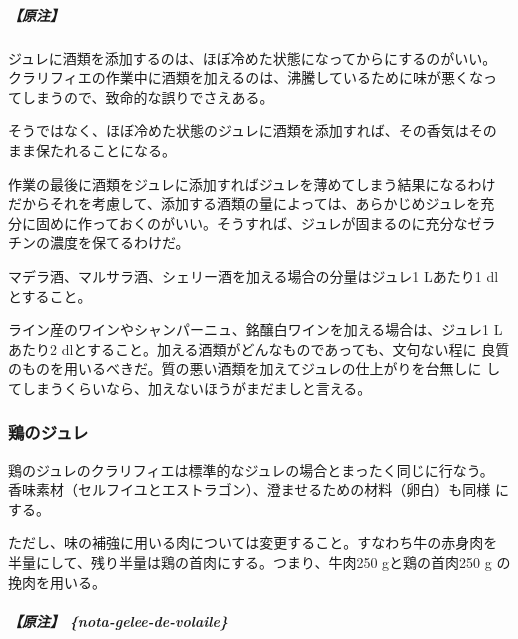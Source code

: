 \begin{recette}
\hypertarget{nota-gelees-grasses-ordinaires}{%
\subparagraph{【原注】}\label{nota-gelees-grasses-ordinaires}}

ジュレに酒類を添加するのは、ほぼ冷めた状態になってからにするのがいい。
クラリフィエの作業中に酒類を加えるのは、沸騰しているために味が悪くなっ
てしまうので、致命的な誤りでさえある。

そうではなく、ほぼ冷めた状態のジュレに酒類を添加すれば、その香気はその
まま保たれることになる。

作業の最後に酒類をジュレに添加すればジュレを薄めてしまう結果になるわけ
だからそれを考慮して、添加する酒類の量によっては、あらかじめジュレを充
分に固めに作っておくのがいい。そうすれば、ジュレが固まるのに充分なゼラ
チンの濃度を保てるわけだ。

マデラ酒、マルサラ酒、シェリー酒を加える場合の分量はジュレ1 Lあたり1
dlとすること。

ライン産のワインやシャンパーニュ、銘醸白ワインを加える場合は、ジュレ1
Lあたり2 dlとすること。加える酒類がどんなものであっても、文句ない程に
良質のものを用いるべきだ。質の悪い酒類を加えてジュレの仕上がりを台無しに
してしまうくらいなら、加えないほうがまだましと言える。

\maeaki

\hypertarget{gelees-de-volaille}{%
\subsubsection{鶏のジュレ}\label{gelees-de-volaille}}



鶏のジュレのクラリフィエは標準的なジュレの場合とまったく同じに行なう。
香味素材（セルフイユとエストラゴン）、澄ませるための材料（卵白）も同様
にする。

ただし、味の補強に用いる肉については変更すること。すなわち牛の赤身肉を
半量にして、残り半量は鶏の首肉にする。つまり、牛肉250 gと鶏の首肉250 g
の挽肉を用いる。

\hypertarget{ux539fux6ce8-nota-gelee-de-volaile}{%
\subparagraph{【原注】
\{nota-gelee-de-volaile\}}\label{ux539fux6ce8-nota-gelee-de-volaile}}


\end{recette}
